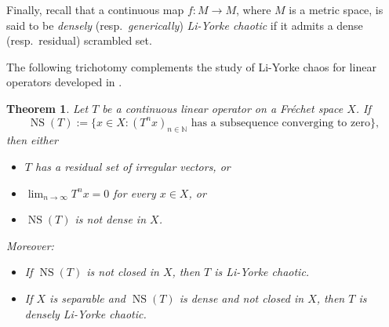 \documentclass[12pt]{amsart}
\theoremstyle{theorem}
\newtheorem{theorem}{Theorem}%
\theoremstyle{definition}
\theoremstyle{remark} \theoremstyle{question} \theoremstyle{example}
\newcommand{\N}{\mathbb{N}}
\newcommand{\NS}{\operatorname{NS}}
\begin{document}
Finally, recall that a continuous map $f : M \to M$, where $M$ is a metric space, is said to be {\em densely} (resp.\ {\em generically}) 
{\em Li-Yorke chaotic} if it admits a dense (resp.\ residual) scrambled set.

\smallskip
The following trichotomy complements the study of Li-Yorke chaos for linear operators developed in \cite{BerBonMulPer15}.

\begin{theorem}\label{Trichotomy}
Let $T$ be a continuous linear operator on a Fr\'echet space $X$. If
\[
\NS(T)\!:= \{x \in X : (T^n x)_{n \in \N} \text{ has a subsequence converging to zero}\},
\]
then either
\begin{itemize}
\item [\rm (a)] $T$ has a residual set of irregular vectors, or
\item [\rm (b)] $\displaystyle \lim_{n \to \infty} T^n x = 0$ for every $x \in X$, or
\item [\rm (c)] $\NS(T)$ is not dense in $X$.
\end{itemize}
Moreover:
\begin{itemize}
\item [\rm (A)] If $\NS(T)$ is not closed in $X$, then $T$ is Li-Yorke chaotic.
\item [\rm (B)] If $X$ is separable and $\NS(T)$ is dense and not closed in $X$, then $T$ is densely Li-Yorke chaotic.
\end{itemize}
\end{theorem}
\end{document}
